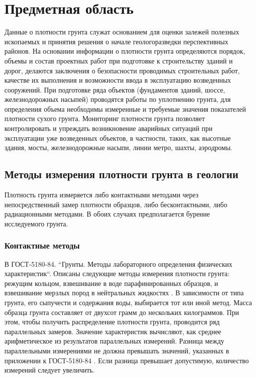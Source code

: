 \chapter{Предметная область} \label{chapt1}
Данные о плотности грунта служат основанием для оценки залежей полезных ископаемых 
и принятия решения о начале геологоразведки перспективных районов. На основании  информации о плотности грунта 
определяются порядок, объемы и состав проектных работ при подготовке к строительству зданий и дорог, делаются заключения о безопасности проводимых 
строительных работ, качестве их выполнения и возможности ввода в эксплуатацию возведенных сооружений. При подготовке ряда объектов 
(фундаментов зданий, шоссе, железнодорожных насыпей) проводятся работы по уплотнению грунта,
 для определения объема необходимы измеренные и требуемые значения показателей плотности сухого грунта.
Мониторинг плотности грунта позволяет контролировать и упреждать возникновение аварийных ситуаций при эксплуатации уже возведенных объектов, 
в частности, таких, как высотные здания, мосты, железнодорожные насыпи, линии метро, шахты, аэродромы.


\section{Методы измерения плотности грунта в геологии} \label{sect1_1}

Плотность грунта измеряется либо контактными методами через непосредственный замер плотности образцов, 
либо бесконтактными, либо радиационными методами. 
В обоих случаях предполагается бурение исследуемого грунта. 

\subsection{Контактные методы}\label{subsect1_1_1}

В ГОСТ-5180-84. ``Грунты. Методы лабораторного определения физических характеристик``. Описаны следующие 
методы измерения плотности грунта: режущим кольцом, взвешивание в воде парафинированных образцов, и 
взвешивание мерзлых пород в нейтральных жидкостях . В зависимости от типа грунта, его сыпучести и содержания воды,
выбирается тот или иной метод. Масса образца грунта составляет от двухсот грамм до нескольких килограммов. При этом, чтобы получить 
распределение плотности грунта, проводится ряд параллельных замеров. Значение характеристик вычисляют, как 
среднее арифметическое из результатов параллельных измерений. 
Разница между параллельными измерениями не должна превышать значений, указанных в приложении к ГОСТ-5180-84 \cite{gost5180}. 
Если разница превышает допустимую, количество измерений следует увеличить.

